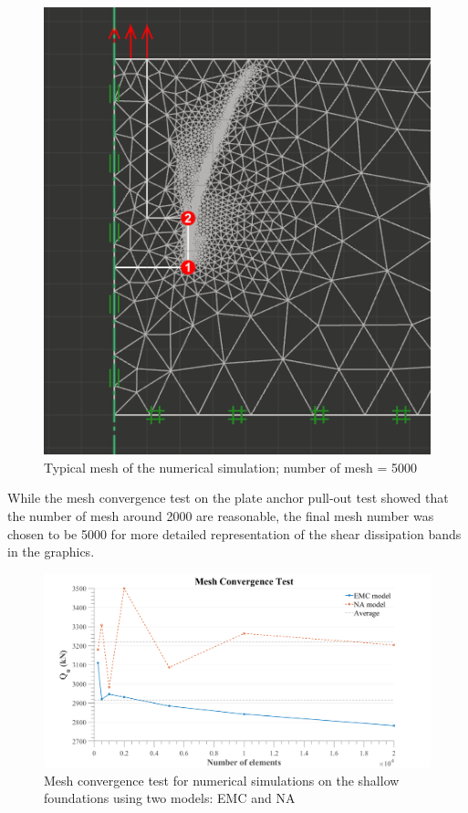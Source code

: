 \documentclass[a4paper, nobind]{templates/ociamthesis}
\begin{document}
\begin{figure}[H]
\includegraphics[width=1\linewidth]{myfigureeeeee/typicalresult2} \caption{Typical mesh of the numerical simulation; number of mesh = 5000}\label{fig:unnamed-chunk-35}
\end{figure}

While the mesh convergence test on the plate anchor pull-out test showed that the number of mesh around 2000 are reasonable, the final mesh number was chosen to be 5000 for more detailed representation of the shear dissipation bands in the graphics.

\begin{figure}[H]
\includegraphics[width=1\linewidth]{myfigureeeeee/meshconvergence2} \caption{Mesh convergence test for numerical simulations on the shallow foundations using two models: EMC and NA}\label{fig:unnamed-chunk-36}
\end{figure}
\end{document}
